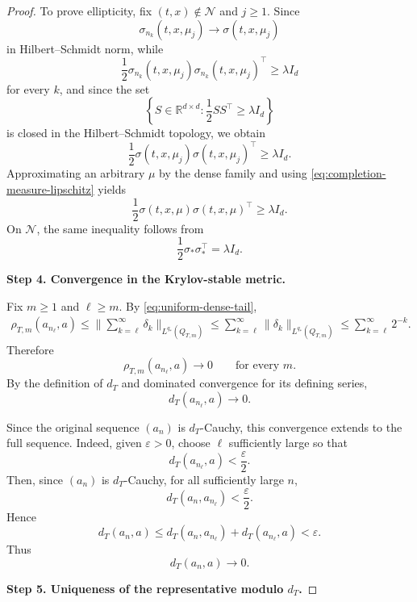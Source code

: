 \documentclass[12pt,oneside, reqno]{amsart}
\numberwithin{equation}{section}
\begin{document}
\begin{proof}
		To prove ellipticity, fix
		\((t,x)\notin\mathcal N\) and \(j\geq1\).
		Since
		\[
		\sigma_{n_k}(t,x,\mu_j)
		\longrightarrow
		\sigma(t,x,\mu_j)
		\]
		in Hilbert--Schmidt norm, while
		\[
		\frac12
		\sigma_{n_k}(t,x,\mu_j)
		\sigma_{n_k}(t,x,\mu_j)^\top
		\geq
		\lambda I_d
		\]
		for every \(k\), and since the set
		\[
		\left\{
		S\in\mathbb R^{d\times d}:
		\frac12SS^\top\geq\lambda I_d
		\right\}
		\]
		is closed in the Hilbert--Schmidt topology, we obtain
		\[
		\frac12
		\sigma(t,x,\mu_j)
		\sigma(t,x,\mu_j)^\top
		\geq
		\lambda I_d.
		\]
		Approximating an arbitrary \(\mu\) by the dense family and using
		\eqref{eq:completion-measure-lipschitz} yields
		\begin{equation}
			\label{eq:completion-ellipticity}
			\frac12
			\sigma(t,x,\mu)\sigma(t,x,\mu)^\top
			\geq
			\lambda I_d.
		\end{equation}
		On \(\mathcal N\), the same inequality follows from
		\[
		\frac12
		\sigma_\ast\sigma_\ast^\top
		=
		\lambda I_d.
		\]
		
	
		\textbf{Step 4. Convergence in the Krylov-stable metric.}
		
		Fix \(m\geq1\) and \(\ell\geq m\). By
		\eqref{eq:uniform-dense-tail},
		\[
		\begin{aligned}
			\rho_{T,m}(a_{n_\ell},a)
			\leq	\big\|
			\sum_{k=\ell}^{\infty}\delta_k\big\|_{L^{q_\ast}(Q_{T,m})}	
			\leq\sum_{k=\ell}^{\infty}\|\delta_k\|_{L^{q_\ast}(Q_{T,m})}
			\leq\sum_{k=\ell}^{\infty}2^{-k}.
		\end{aligned}
		\]
		Therefore
		\[
		\rho_{T,m}(a_{n_\ell},a)
		\longrightarrow0
		\qquad
		\text{for every }m.
		\]
		By the definition of \(d_T\) and dominated convergence for its
		defining series,
		\[
		d_T(a_{n_\ell},a)
		\longrightarrow0.
		\]
		
		Since the original sequence \((a_n)\) is \(d_T\)-Cauchy, this
		convergence extends to the full sequence. Indeed, given
		\(\varepsilon>0\), choose \(\ell\) sufficiently large so that
		\[
		d_T(a_{n_\ell},a)<\frac{\varepsilon}{2}.
		\]
		Then, since \((a_n)\) is \(d_T\)-Cauchy, for all sufficiently large
		\(n\),
		\[
		d_T(a_n,a_{n_\ell})<\frac{\varepsilon}{2}.
		\]
		Hence
		\[
		d_T(a_n,a)
		\leq
		d_T(a_n,a_{n_\ell})
		+
		d_T(a_{n_\ell},a)
		<
		\varepsilon.
		\]
		Thus
		\begin{equation}
			\label{eq:completion-full-sequence-convergence}
			d_T(a_n,a)
			\longrightarrow0.
		\end{equation}
		
		\textbf{Step 5. Uniqueness of the representative modulo \(d_T\).}
		

\end{proof}
\end{document}
